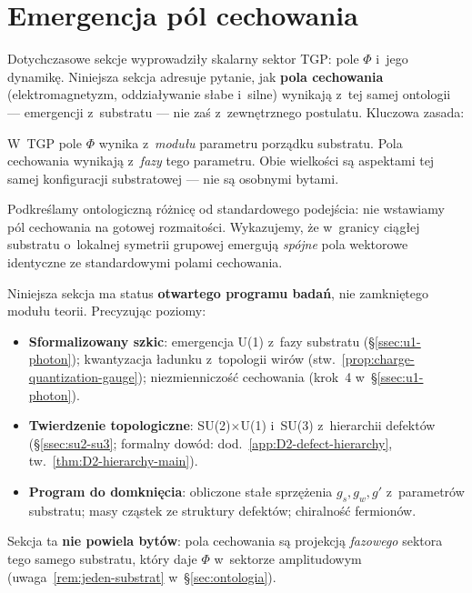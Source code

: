 \section{Emergencja p\'ol cechowania}\label{sec:cechowanie}

Dotychczasowe sekcje wyprowadziły skalarny sektor TGP: pole $\Phi$
i~jego dynamikę. Niniejsza sekcja adresuje pytanie, jak
\textbf{pola cechowania} (elektromagnetyzm, oddziaływanie słabe
i~silne) wynikają z~tej samej ontologii --- emergencji z~substratu ---
nie zaś z~zewnętrznego postulatu. Kluczowa zasada:

\begin{remark}\label{rem:gauge-emergence-principle}
W~TGP pole $\Phi$ wynika z~\emph{modułu} parametru porządku
substratu. Pola cechowania wynikają z~\emph{fazy} tego parametru.
Obie wielkości są aspektami tej samej konfiguracji substratowej ---
nie są osobnymi bytami.
\end{remark}

Podkreślamy ontologiczną różnicę od standardowego podejścia:
nie wstawiamy pól cechowania na gotowej rozmaitości.
Wykazujemy, że w~granicy ciągłej substratu o~lokalnej symetrii
grupowej emergują \emph{spójne} pola wektorowe identyczne
ze standardowymi polami cechowania.

\begin{remark}\label{rem:gauge-section-status}
Niniejsza sekcja ma status \textbf{otwartego programu badań},
nie zamkniętego modułu teorii. Precyzując poziomy:
\begin{itemize}[nosep]
  \item \textbf{Sformalizowany szkic}: emergencja U(1) z~fazy substratu
    (\S\ref{ssec:u1-photon}); kwantyzacja ładunku z~topologii wirów
    (stw.~\ref{prop:charge-quantization-gauge});
    niezmienniczość cechowania (krok~4 w~\S\ref{ssec:u1-photon}).
  \item \textbf{Twierdzenie topologiczne}: SU(2)$\times$U(1) i~SU(3)
    z~hierarchii defekt\'ow (\S\ref{ssec:su2-su3};
    formalny dow\'od: dod.~\ref{app:D2-defect-hierarchy},
    tw.~\ref{thm:D2-hierarchy-main}).
  \item \textbf{Program do domknięcia}: obliczone stałe sprzężenia
    $g_s, g_w, g'$ z~parametrów substratu; masy cząstek ze struktury
    defektów; chiralność fermionów.
\end{itemize}
Sekcja ta \textbf{nie powiela bytów}: pola cechowania są projekcją
\emph{fazowego} sektora tego samego substratu, który daje $\Phi$
w~sektorze amplitudowym (uwaga~\ref{rem:jeden-substrat} w~\S\ref{sec:ontologia}).
\end{remark}

